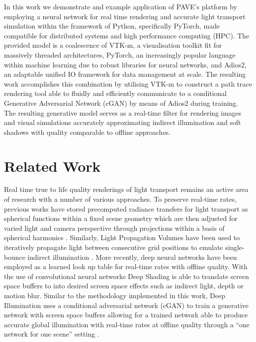 \documentclass[sigconf,authordraft]{acmart}%
\begin{document}
In this work we demonstrate and example application of PAVE's platform by employing a neural network for real time rendering and accurate light transport simulation within the framework of Python, specifically PyTorch, made compatible for distributed systems and high performance computing (HPC). The provided model is a coalescence of VTK-m, a visualisation toolkit fit for massively threaded architectures, PyTorch, an  increasingly popular language within machine learning due to robust libraries for neural networks, and Adios2, an adaptable unified IO framework for data management at scale. The resulting work accomplishes this combination by utilising VTK-m to construct a path trace rendering tool able to fluidly and efficiently communicate to a conditional Generative Adversarial Network (cGAN) by means of Adios2 during training.   The resulting generative model serves as a real-time filter for rendering images and visual simulations accurately approximating indirect illumination and soft shadows with quality comparable to offline approaches. 

\section{Related Work}

Real time true to life quality renderings of light transport remains an active area of research with a number of various approaches. To preserve real-time rates, previous works have stored precomputed radiance transfers for light transport as spherical functions within a fixed scene geometry which are then adjusted for varied light and camera perspective through projections within a basis of spherical harmonics \cite{sloanPrecompRad}. Similarly, Light Propagation Volumes have been used to iteratively propagate light between consecutive grid positions to emulate single-bounce indirect illumination \cite{kaplanyanCasac}. More recently, deep neural  networks have been employed as a learned look up table for real-time rates with offline quality. With the use of convolutional neural networks Deep Shading is able to translate screen space buffers to into desired screen space effects such as indirect light, depth or motion blur. Similar to the methodology implemented in this work, Deep Illumination uses a conditional adversarial network (cGAN) to train a generative network with screen space buffers allowing for a trained network able to produce accurate global illumination with real-time rates at offline quality through a ``one network for one scene'' setting  \cite{deepillum}.
\end{document}
